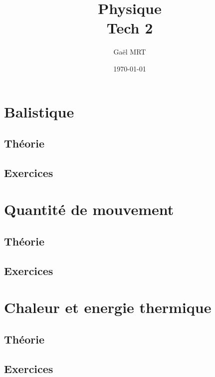 \documentclass{report}
\title{Physique \\ Tech 2}
\author{Gaël MRT}
\date{\today}
\begin{document}
\maketitle

\tableofcontents
\thispagestyle{fancy}

\chapter{Balistique}
\thispagestyle{fancy}
\section{Théorie}

\section{Exercices}




\newpage
\chapter{Quantité de mouvement}
\thispagestyle{fancy}
\section{Théorie}



\section{Exercices}



\chapter{Chaleur et energie thermique}
\section{Théorie}



\section{Exercices}



\end{document}
